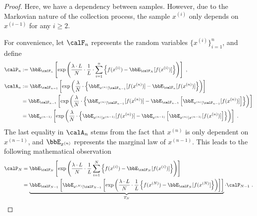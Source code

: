 \documentclass[11pt]{article}
\newcounter{ct}
\begin{document}
\begin{proof}
Here, we have a dependency between samples.
However, due to the Markovian nature of the collection process, the sample \(x^{(i)}\) only depends on \(x^{(i - 1)}\) for any \(i \geq 2\).

For convenience, let \(\calF_{n}\) represents the random variables \(\{x^{(i)}\}_{i=1}^{n}\), and define 
\begin{align*}
    \calP_{n} &:= \bbE_{\calF_{n}}\left[\exp\left(\frac{\lambda \cdot L}{N} \cdot \frac{1}{L} \cdot \sum_{i=1}^{n}\left\{ f(x^{(i)}) - \bbE_{\calF_{N}}[f(x^{(i)})]\right\}\right)\right]~, \\
    \calA_{n} &:= \bbE_{\calF_{n - 1}}\left[\exp\left(\frac{\lambda}{N} \cdot \left\{\bbE_{x^{(n)} | \calF_{n - 1}}[f(x^{(n)})] - \bbE_{\calF_{n}}[f(x^{(n)})]\right\}\right)\right] \\
    &= \bbE_{\calF_{n - 1}}\left[\exp\left(\frac{\lambda}{N} \cdot \left\{\bbE_{x^{(n)} | \calF_{n - 1}}[f(x^{(n)})] - \bbE_{\calF_{n - 1}}\left[\bbE_{x^{(n)} | \calF_{n - 1}}[f(x^{(n)})]\right]\right\}\right)\right] \\
    &= \bbE_{x^{(n - 1)}}\left[\exp\left(\frac{\lambda}{N} \cdot \left\{\bbE_{x^{(n)} | x^{(n - 1)}}[f(x^{(n)})] - \bbE_{x^{(n - 1)}}\left[\bbE_{x^{(n)} | x^{(n - 1)}}[f(x^{(n)})]\right]\right\}\right)\right]~.
\end{align*}
The last equality in \(\calA_{n}\) stems from the fact that \(x^{(n)}\) is only dependent on \(x^{(n - 1)}\), and \(\bbE_{x^{(n)}}\) represents the marginal law of \(x^{(n - 1)}\).
This leads to the following mathematical observation
\begin{align*}
   \calP_{N} &= \bbE_{\calF_{N}}\left[\exp\left(\frac{\lambda \cdot L}{N} \cdot \frac{1}{L}\sum_{i=1}^{N}\left\{ f(x^{(i)}) - \bbE_{\calF_{N}}[f(x^{(i)})]\right\}\right)\right] \\
   &= \underbrace{\bbE_{\calF_{N - 1}}\left[\bbE_{x^{(N)} | \calF_{N - 1}}\left[\exp\left(\frac{\lambda \cdot L}{N} \cdot \frac{1}{L}\left\{f(x^{(N)}) - \bbE_{\calF_{N}}[f(x^{(N)}]\right\}\right)\right]\right]}_{T_{N}} \cdot \calP_{N - 1}~.
\end{align*}


\end{proof}
\end{document}

